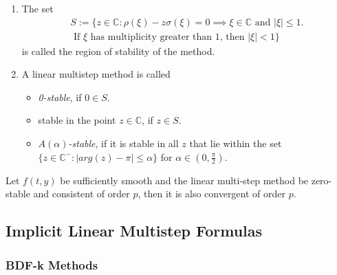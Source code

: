 	\begin{frame}
			\begin{definition}
			\begin{enumerate}
				\item 
				The set
				\begin{equation}
					\begin{aligned}
						S := \{z \in \mathbb{C} : \rho(\xi) - z \sigma(\xi) = 0 \implies \xi \in \mathbb{C} \text{ and } |\xi| \leq 1. \\
						\text{ If $\xi$ has multiplicity greater than $1$, then } |\xi| < 1\}
					\end{aligned}
				\end{equation}
				is called the region of stability of the method.
				\item 
				A linear multistep method is called
				\begin{itemize}
					\item \emph{0-stable}, if $0 \in S$.
					\item stable in the point $z \in \mathbb{C}$, if $z \in S$.
					\item \emph{$A(\alpha)$-stable}, if it is stable in all $z$ that lie within the set $\{z \in \mathbb{C}^- : |arg(z)-\pi| \leq \alpha\}$ for $\alpha \in (0, \frac{\pi}{2})$.		 
				\end{itemize}
			\end{enumerate}
		\end{definition}
	\end{frame}
	
	\begin{frame}
		\begin{theorem}%
			\label{th: null-stbaility and consistence is convergence}
			Let $f(t,y)$ be sufficiently smooth and the linear multi-step method be zero-stable and consistent of order $p$, then it is also convergent of order $p$.
		\end{theorem}
	\end{frame}
	
	
	\subsection{Implicit Linear Multistep Formulas}
	
	\subsubsection{BDF-k Methods}
	
